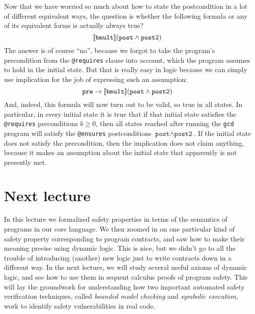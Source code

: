 \documentclass[11pt,twoside]{scrartcl}
\begin{document}
Now that we have worried so much about how to state the postcondition in a lot of different equivalent ways, the question is whether the following formula or any of its equivalent forms is actually always true?
\[
\dbox{\texttt{bmult}}{(\texttt{post} \land \texttt{post2})}
\]
The answer is of course ``no'', because we forgot to take the program's precondition from the \verb'@requires' clause into account, which the program assumes to hold in the initial state.
But that is really easy in logic because we can simply use implication for the job of expressing such an assumption:
\[
\texttt{pre} \limply
\dbox{\texttt{bmult}}{(\texttt{post} \land \texttt{post2})}
\]
And, indeed, this formula will now turn out to be valid, so true in all states.
In particular, in every initial state it is true that if that initial state satisfies the \verb'@requires' preconditions \(b \ge 0\), then all states reached after running the \texttt{gcd} program will satisfy the \verb'@ensures' postconditions \(\texttt{post} \land \texttt{post2}\).
If the initial state does not satisfy the precondition, then the implication does not claim anything, because it makes an assumption about the initial state that apparently is not presently met.

\section{Next lecture}
In this lecture we formalized safety properties in terms of the semantics of programs in our core language. We then zoomed in on one particular kind of safety property corresponding to program contracts, and saw how to make their meaning precise using dynamic logic. This is nice, but we didn't go to all the trouble of introducing (another) new logic just to write contracts down in a different way. In the next lecture, we will study several useful axioms of dynamic logic, and see how to use them in sequent calculus proofs of program safety. This will lay the groundwork for understanding how two important automated safety verification techniques, called \emph{bounded model checking} and \emph{symbolic execution}, work to identify safety vulnerabilities in real code.


\end{document}
